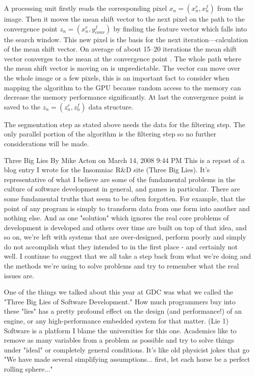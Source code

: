 A processing unit firstly reads the corresponding pixel $x_n = (x_n^r, x_n^f)$
from the image. Then it moves the mean shift vector to the next pixel on the
path to the convergence point $z_n = (x_n^r, y_{conv}^f)$ by finding the feature
vector which falls into the search window. This new pixel is the basis for the
next iteration---calculation of the mean shift vector. On average of about
15--20 iterations the mean shift vector converges to the mean at the convergence
point \citep{DBLP:conf/eccv/ZhangKT06}. The whole path where the mean shift
vector is moving on is unpredictable. The vector can move over the whole image
or a few pixels, this is an important fact to consider when mapping the
algorithm to the \gls{GPU} because random access to the memory can decrease the
memory performance significantly. At last the convergence point is saved to the
$z_n = (z_n^r, z_n^f)$ data structure.

The segmentation step as stated above needs the data for the filtering step. The
only parallel portion of the algorithm is the filtering step so no further 
considerations will be made. 


Three Big Lies By Mike Acton on March 14, 2008 9:44 PM This is a repost of a
blog entry I wrote for the Insomniac R\&D site (Three Big Lies). It's
representative of what I believe are some of the fundamental problems in the
culture of software development in general, and games in particular. There are
some fundamental truths that seem to be often forgotten. For example, that the
point of any program is simply to transform data from one form into another and
nothing else. And as one "solution" which ignores the real core problems of
development is developed and others over time are built on top of that idea, and
so on, we're left with systems that are over-designed, perform poorly and simply
do not accomplish what they intended to in the first place - and certainly not
well. I continue to suggest that we all take a step back from what we're doing
and the methods we're using to solve problems and try to remember what the real
issues are.

One of the things we talked about this year at GDC was what we called the "Three
Big Lies of Software Development." How much programmers buy into these "lies"
has a pretty profound effect on the design (and performance!) of an engine, or
any high-performance embedded system for that matter. (Lie 1) Software is a
platform I blame the universities for this one. Academics like to remove as many
variables from a problem as possible and try to solve things under "ideal" or
completely general conditions. It's like old physicist jokes that go "We have
made several simplifying assumptions... first, let each horse be a perfect
rolling sphere..."

